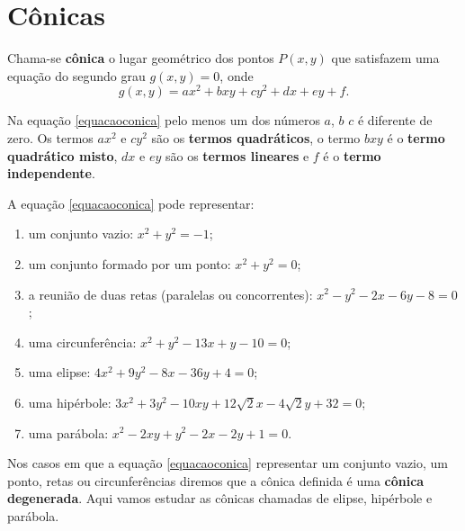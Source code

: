 
\section{C\^onicas} %
\label{sec:conicas}

\begin{definicao}
  Chama-se \textbf{c\^onica} o lugar geométrico dos pontos $P(x,y)$ que satisfazem uma equação do segundo grau $g(x,y) = 0$, onde
  \begin{equation}\label{equacaoconica}
    g(x,y) = ax^2 + bxy + cy^2 + dx + ey + f.
  \end{equation}
\end{definicao}

Na equação \eqref{equacaoconica} pelo menos um dos n\'umeros $a$, $b$ $c$ é diferente de zero. Os termos $ax^2$ e $cy^2$ são os \textbf{termos quadr\'aticos}, o termo $bxy$ é o \textbf{termo quadr\'atico misto}, $dx$ e $ey$ são os \textbf{termos lineares} e $f$ é o \textbf{termo independente}.    

A equação \eqref{equacaoconica} pode representar:
\begin{enumerate}[label=({\arabic*})]
  \item um conjunto vazio: $x^2 + y^2 = -1$;
  \item um conjunto formado por um ponto: $x^2 + y^2 = 0$;
  \item a reunião de duas retas (paralelas ou concorrentes): $x^2 - y^2 - 2x - 6y -8 =0$;
  \item uma circunferência: $x^2 + y^2 - 13x + y - 10 = 0$;
  \item uma elipse: $4x^2 + 9y^2 - 8x - 36y + 4 = 0$;
  \item uma hipérbole: $3x^2 + 3y^2 - 10xy + 12\sqrt{2}x - 4\sqrt{2}y + 32 = 0$;
  \item uma par\'abola: $x^2 - 2xy + y^2 -2x - 2y + 1 = 0$.
\end{enumerate}

Nos casos em que a equação \eqref{equacaoconica} representar um conjunto vazio, um ponto, retas ou circunferências diremos que a c\^onica definida é uma \textbf{c\^onica degenerada}. Aqui vamos estudar as c\^onicas chamadas de elipse, hipérbole e par\'abola.

